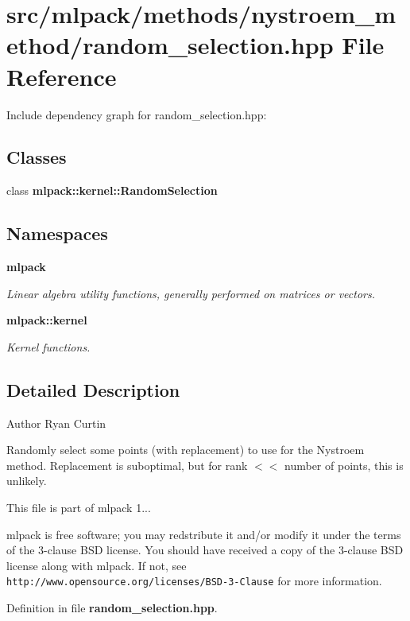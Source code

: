 \section{src/mlpack/methods/nystroem\-\_\-method/random\-\_\-selection.hpp File Reference}
\label{random__selection_8hpp}
Include dependency graph for random\-\_\-selection.\-hpp\-:
\subsection*{Classes}
\begin{DoxyCompactItemize}
\item 
class {\bf mlpack\-::kernel\-::\-Random\-Selection}
\end{DoxyCompactItemize}
\subsection*{Namespaces}
\begin{DoxyCompactItemize}
\item 
{\bf mlpack}
\begin{DoxyCompactList}\small\item\em Linear algebra utility functions, generally performed on matrices or vectors. \end{DoxyCompactList}\item 
{\bf mlpack\-::kernel}
\begin{DoxyCompactList}\small\item\em Kernel functions. \end{DoxyCompactList}\end{DoxyCompactItemize}


\subsection{Detailed Description}
\begin{DoxyAuthor}{Author}
Ryan Curtin
\end{DoxyAuthor}
Randomly select some points (with replacement) to use for the Nystroem method. Replacement is suboptimal, but for rank $<$$<$ number of points, this is unlikely.

This file is part of mlpack 1...

mlpack is free software; you may redstribute it and/or modify it under the terms of the 3-\/clause B\-S\-D license. You should have received a copy of the 3-\/clause B\-S\-D license along with mlpack. If not, see {\tt http\-://www.\-opensource.\-org/licenses/\-B\-S\-D-\/3-\/\-Clause} for more information. 

Definition in file {\bf random\-\_\-selection.\-hpp}.

